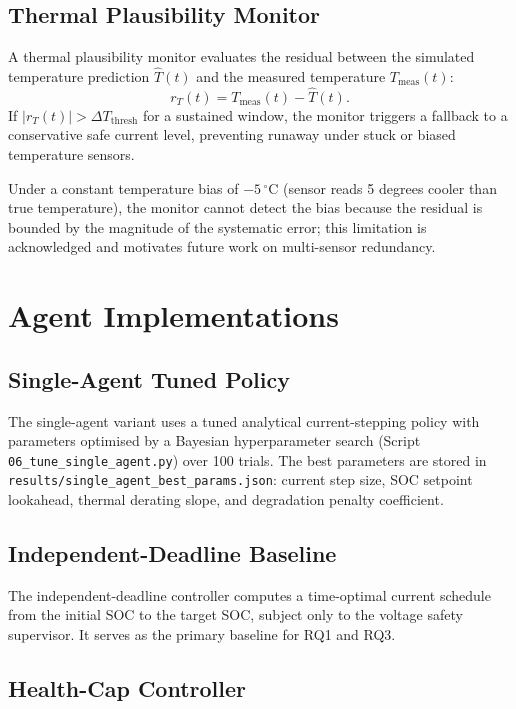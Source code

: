 \subsection{Thermal Plausibility Monitor}

A thermal plausibility monitor evaluates the residual between the
simulated temperature prediction $\hat{T}(t)$ and the measured
temperature $T_{\mathrm{meas}}(t)$:
\begin{equation}
  r_T(t) = T_{\mathrm{meas}}(t) - \hat{T}(t).
\end{equation}
If $|r_T(t)| > \Delta T_{\mathrm{thresh}}$ for a sustained window,
the monitor triggers a fallback to a conservative safe current level,
preventing runaway under stuck or biased temperature sensors.

Under a constant temperature bias of $-5\,^\circ\mathrm{C}$
(sensor reads 5 degrees cooler than true temperature), the monitor
cannot detect the bias because the residual is bounded by the
magnitude of the systematic error; this limitation is acknowledged
and motivates future work on multi-sensor redundancy.

\section{Agent Implementations}

\subsection{Single-Agent Tuned Policy}

The single-agent variant uses a tuned analytical current-stepping
policy with parameters optimised by a Bayesian hyperparameter search
(Script \texttt{06\_tune\_single\_agent.py}) over 100 trials.  The
best parameters are stored in
\texttt{results/single\_agent\_best\_params.json}:
current step size, SOC setpoint lookahead, thermal derating slope,
and degradation penalty coefficient.

\subsection{Independent-Deadline Baseline}

The independent-deadline controller computes a time-optimal current
schedule from the initial SOC to the target SOC, subject only to
the voltage safety supervisor.  It serves as the primary baseline
for RQ1 and RQ3.

\subsection{Health-Cap Controller}

